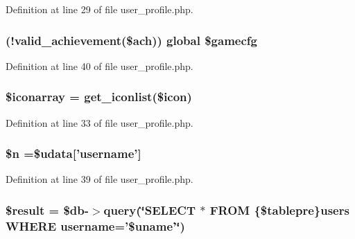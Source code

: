 Definition at line 29 of file user\+\_\+profile.\+php.

\hypertarget{user__profile_8php_af4ae00ffed2be30bd49a2271157ea9e4}{
\subsubsection[{\$gamecfg}]{ (!{\bf valid\+\_\+achievement}(\$ach)) global \$gamecfg}}\label{user__profile_8php_af4ae00ffed2be30bd49a2271157ea9e4}


Definition at line 40 of file user\+\_\+profile.\+php.

\hypertarget{user__profile_8php_ae8f70f9240aceaf398e05d6e00e7b8e5}{
\subsubsection[{\$iconarray}]{\setlength{\rightskip}{0pt plus 5cm}\$iconarray = {\bf get\+\_\+iconlist}(\$icon)}}\label{user__profile_8php_ae8f70f9240aceaf398e05d6e00e7b8e5}


Definition at line 33 of file user\+\_\+profile.\+php.

\hypertarget{user__profile_8php_aa5fae90470d460a65d5211ec08e6b05c}{
\subsubsection[{\$n}]{\setlength{\rightskip}{0pt plus 5cm}\$n =\$udata\mbox{[}'username'\mbox{]}}}\label{user__profile_8php_aa5fae90470d460a65d5211ec08e6b05c}


Definition at line 39 of file user\+\_\+profile.\+php.

\hypertarget{user__profile_8php_a112ef069ddc0454086e3d1e6d8d55d07}{
\subsubsection[{\$result}]{\setlength{\rightskip}{0pt plus 5cm}\${\bf result} = \$db-\/$>$query(\char`\"{}S\+E\+L\+E\+C\+T $\ast$ F\+R\+O\+M \{\$tablepre\}users W\+H\+E\+R\+E username='\$uname'\char`\"{})}}\label{user__profile_8php_a112ef069ddc0454086e3d1e6d8d55d07}


